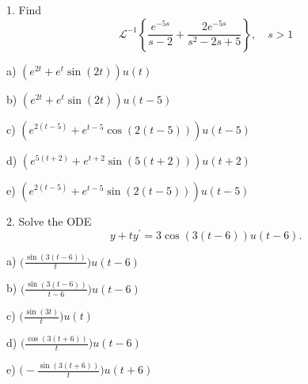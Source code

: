 \documentclass{amsart}
\begin{document}
1. Find 
\[\mathscr{L}^{-1}\left\{\frac{e^{-5s}}{s-2} + \frac{2e^{-5s}}{s^2-2s+5}\right\}, \quad s>1\]

a) $(e^{2t} + e^{t}\sin(2t))u(t)$

b) $(e^{2t} + e^{t}\sin(2t))u(t-5)$

c) $(e^{2(t-5)} + e^{t-5}\cos(2(t-5)))u(t-5)$

d) $(e^{5(t+2)} + e^{t+2}\sin(5(t+2)))u(t+2)$

e) $(e^{2(t-5)} + e^{t-5}\sin(2(t-5)))u(t-5)$ %

2. Solve the ODE \[y+ ty^{\prime} = 3\cos(3(t-6))u(t-6).\]

a) $\displaystyle \bigg(\frac{\sin(3(t-6))}{t}\bigg)u(t-6)$ %

b) $\displaystyle \bigg(\frac{\sin(3(t-6))}{t-6}\bigg)u(t-6)$

c) $\displaystyle \bigg(\frac{\sin(3t)}{t}\bigg)u(t)$

d) $\displaystyle \bigg(\frac{\cos(3(t+6))}{t}\bigg)u(t-6)$

e) $\displaystyle \bigg(-\frac{\sin(3(t+6))}{t}\bigg)u(t+6)$
\end{document}
